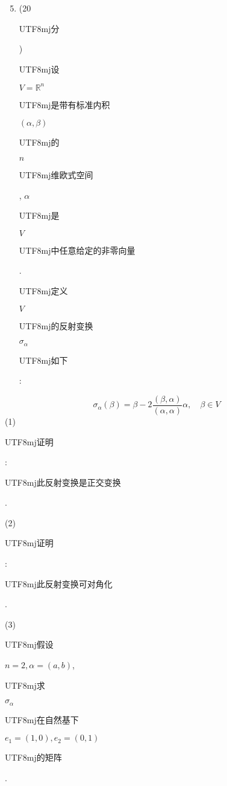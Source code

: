\documentclass[10pt]{article}
\begin{document}
\begin{enumerate}
  \setcounter{enumi}{4}
  \item (20 \begin{CJK}{UTF8}{mj}分\end{CJK}) \begin{CJK}{UTF8}{mj}设\end{CJK} $V=\mathbb{R}^{n}$ \begin{CJK}{UTF8}{mj}是带有标准内积\end{CJK} $(\alpha, \beta)$ \begin{CJK}{UTF8}{mj}的\end{CJK} $n$ \begin{CJK}{UTF8}{mj}维欧式空间\end{CJK}, $\alpha$ \begin{CJK}{UTF8}{mj}是\end{CJK} $V$ \begin{CJK}{UTF8}{mj}中任意给定的非零向量\end{CJK}. \begin{CJK}{UTF8}{mj}定义\end{CJK} $V$ \begin{CJK}{UTF8}{mj}的反射变换\end{CJK} $\sigma_{\alpha}$ \begin{CJK}{UTF8}{mj}如下\end{CJK}:
\end{enumerate}
$$
\sigma_{\alpha}(\beta)=\beta-2 \frac{(\beta, \alpha)}{(\alpha, \alpha)} \alpha, \quad \beta \in V
$$
(1) \begin{CJK}{UTF8}{mj}证明\end{CJK}: \begin{CJK}{UTF8}{mj}此反射变换是正交变换\end{CJK}.

(2) \begin{CJK}{UTF8}{mj}证明\end{CJK}: \begin{CJK}{UTF8}{mj}此反射变换可对角化\end{CJK}.

(3) \begin{CJK}{UTF8}{mj}假设\end{CJK} $n=2, \alpha=(a, b)$, \begin{CJK}{UTF8}{mj}求\end{CJK} $\sigma_{\alpha}$ \begin{CJK}{UTF8}{mj}在自然基下\end{CJK} $e_{1}=(1,0), e_{2}=(0,1)$ \begin{CJK}{UTF8}{mj}的矩阵\end{CJK}.
\end{document}
